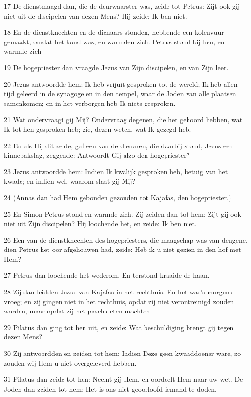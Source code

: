 \par 17 De dienstmaagd dan, die de deurwaarster was, zeide tot Petrus: Zijt ook gij niet uit de discipelen van dezen Mens? Hij zeide: Ik ben niet.
\par 18 En de dienstknechten en de dienaars stonden, hebbende een kolenvuur gemaakt, omdat het koud was, en warmden zich. Petrus stond bij hen, en warmde zich.
\par 19 De hogepriester dan vraagde Jezus van Zijn discipelen, en van Zijn leer.
\par 20 Jezus antwoordde hem: Ik heb vrijuit gesproken tot de wereld; Ik heb allen tijd geleerd in de synagoge en in den tempel, waar de Joden van alle plaatsen samenkomen; en in het verborgen heb Ik niets gesproken.
\par 21 Wat ondervraagt gij Mij? Ondervraag degenen, die het gehoord hebben, wat Ik tot hen gesproken heb; zie, dezen weten, wat Ik gezegd heb.
\par 22 En als Hij dit zeide, gaf een van de dienaren, die daarbij stond, Jezus een kinnebakslag, zeggende: Antwoordt Gij alzo den hogepriester?
\par 23 Jezus antwoordde hem: Indien Ik kwalijk gesproken heb, betuig van het kwade; en indien wel, waarom slaat gij Mij?
\par 24 (Annas dan had Hem gebonden gezonden tot Kajafas, den hogepriester.)
\par 25 En Simon Petrus stond en warmde zich. Zij zeiden dan tot hem: Zijt gij ook niet uit Zijn discipelen? Hij loochende het, en zeide: Ik ben niet.
\par 26 Een van de dienstknechten des hogepriesters, die maagschap was van dengene, dien Petrus het oor afgehouwen had, zeide: Heb ik u niet gezien in den hof met Hem?
\par 27 Petrus dan loochende het wederom. En terstond kraaide de haan.
\par 28 Zij dan leidden Jezus van Kajafas in het rechthuis. En het was's morgens vroeg; en zij gingen niet in het rechthuis, opdat zij niet verontreinigd zouden worden, maar opdat zij het pascha eten mochten.
\par 29 Pilatus dan ging tot hen uit, en zeide: Wat beschuldiging brengt gij tegen dezen Mens?
\par 30 Zij antwoordden en zeiden tot hem: Indien Deze geen kwaaddoener ware, zo zouden wij Hem u niet overgeleverd hebben.
\par 31 Pilatus dan zeide tot hen: Neemt gij Hem, en oordeelt Hem naar uw wet. De Joden dan zeiden tot hem: Het is ons niet geoorloofd iemand te doden.
